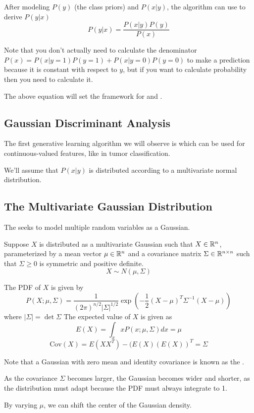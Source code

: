 \documentclass[12pt]{scrartcl}
\begin{document}
After modeling $P(y)$ (the class priors) and $P(x | y)$, the algorithm can use
 to derive $P(y | x)$
\[P(y | x) = \frac{P(x | y)P(y)}{P(x)}\]
\begin{note}
    Note that you don't actually need to calculate the denominator $P(x) = P(x | y = 1)P(y = 1) + P(x | y = 0)P(y = 0)$ to make a prediction because it is constant with respect to $y$, but if you want to calculate probability then you need to calculate it.
\end{note}
The above equation will set the framework for  and .

\subsection{Gaussian Discriminant Analysis}

\begin{definition}
    The first generative learning algorithm we will observe is  which can be used for continuous-valued features, like in tumor classification.
\end{definition}
We'll assume that $P(x|y)$ is distributed according to a multivariate normal distribution.

\subsection{The Multivariate Gaussian Distribution}

\begin{definition}
    The  seeks to model multiple random variables as a Gaussian.
\end{definition}
Suppose $X$ is distributed as a multivariate Gaussian such that $X \in \mathbb R^n$, parameterized by a mean vector $\mu\in\mathbb R^n$ and a covariance matrix $\Sigma\in\mathbb R^{n\times n}$ such that $\Sigma \geq 0$ is symmetric and positive definite.
\[X \sim N(\mu, \Sigma)\]
\begin{lemma}
    The PDF of $X$ is given by
    \[P(X; \mu, \Sigma) = \frac{1}{(2\pi)^{n/2}|\Sigma|^{1/2}}\exp\left(-\frac{1}{2}(X - \mu)^T\Sigma^{-1}(X - \mu)\right)\]
    where $|\Sigma| = \det\Sigma$ The expected value of $X$ is given as
    \[E(X) = \int_x xP(x; \mu, \Sigma) dx = \mu\]
    \[\text{Cov}(X) = E(XX^T) - (E(X)(E(X))^T = \Sigma\]
\end{lemma}
\begin{note}
    Note that a Gaussian with zero mean and identity covariance is known as the .
\end{note}
\begin{note}
    As the covariance $\Sigma$ becomes larger, the Gaussian becomes wider and shorter, as the distribution must adapt because the PDF must always integrate to 1.
\end{note}
\begin{note}
    By varying $\mu$, we can shift the center of the Gaussian density.
\end{note}
\end{document}
